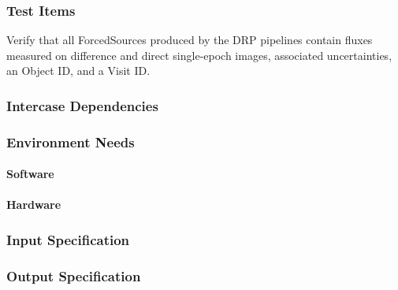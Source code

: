 \subsubsection{Test Items}
Verify that all ForcedSources produced by the DRP pipelines contain
fluxes measured on difference and direct single-epoch images, associated
uncertainties, an Object ID, and a Visit ID.



\subsubsection{Intercase Dependencies}

\subsubsection{Environment Needs}

\paragraph{Software}

\paragraph{Hardware}

\subsubsection{Input Specification}

\subsubsection{Output Specification}

